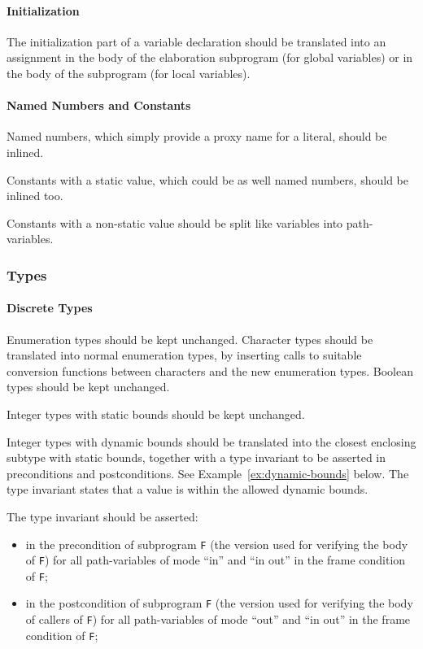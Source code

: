 \documentclass{article}
\begin{document}
\paragraph{Initialization}

The initialization part of a variable declaration should be translated into an
assignment in the body of the elaboration subprogram (for global variables) or
in the body of the subprogram (for local variables).

\paragraph{Named Numbers and Constants}

Named numbers, which simply provide a proxy name for a literal, should be
inlined.

Constants with a static value, which could be as well named numbers, should be
inlined too.

Constants with a non-static value should be split like variables into
path-variables.

\subsubsection{Types}
\label{Ada2SPARK:types}

\paragraph{Discrete Types}

Enumeration types should be kept unchanged. Character types should be
translated into normal enumeration types, by inserting calls to suitable
conversion functions between characters and the new enumeration types. Boolean
types should be kept unchanged.

Integer types with static bounds should be kept unchanged.

Integer types with dynamic bounds should be translated into the closest
enclosing subtype with static bounds, together with a type invariant to be
asserted in preconditions and postconditions. See
Example~\ref{ex:dynamic-bounds} below. The type invariant states that a value
is within the allowed dynamic bounds.

The type invariant should be asserted:
\begin{itemize}
\item in the precondition of subprogram \verb|F| (the version used for
  verifying the body of \verb|F|) for all path-variables of mode ``in'' and
  ``in out'' in the frame condition of \verb|F|;
\item in the postcondition of subprogram \verb|F| (the version used for
  verifying the body of callers of \verb|F|) for all path-variables of mode
  ``out'' and ``in out'' in the frame condition of \verb|F|;
\end{itemize}
\end{document}
